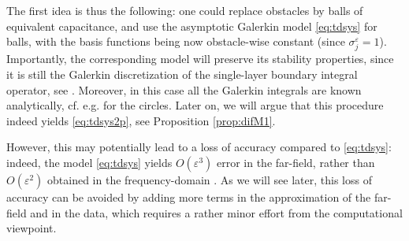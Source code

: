 \documentclass[]{article}
\numberwithin{equation}{section}
\numberwithin{theorem}{section}
\numberwithin{lemma}{section}
\numberwithin{corollary}{section}
\numberwithin{proposition}{section}
\numberwithin{definition}{section}
\newcommand{\re}{\varepsilon}
\begin{document}
	The first idea is thus the following: one could replace obstacles by balls of equivalent capacitance, and use the asymptotic Galerkin model \eqref{eq:tdsys} for balls, with the basis functions being now obstacle-wise constant (since $\sigma_j^{\re}=1$). Importantly, the corresponding model will preserve its stability properties, since it is still the Galerkin discretization of the single-layer boundary integral operator, see \cite{banjai_sauter}. Moreover, in this case all the Galerkin integrals are known analytically, cf. e.g. \cite{MK} for the circles. Later on, we will argue that this procedure indeed yields \eqref{eq:tdsys2p}, see Proposition \ref{prop:difM1}. 
	
	However, this may potentially lead to a loss of accuracy compared to \eqref{eq:tdsys}: indeed, the model \eqref{eq:tdsys} yields $O(\varepsilon^3)$ error in the far-field, rather than $O(\re^2)$ obtained in the frequency-domain \cite{sini_frequency_domain}. As we will see later, this loss of accuracy can be avoided by adding more terms in the approximation of the far-field and in the data, which requires a rather minor effort from the computational viewpoint. 
	
\end{document}
